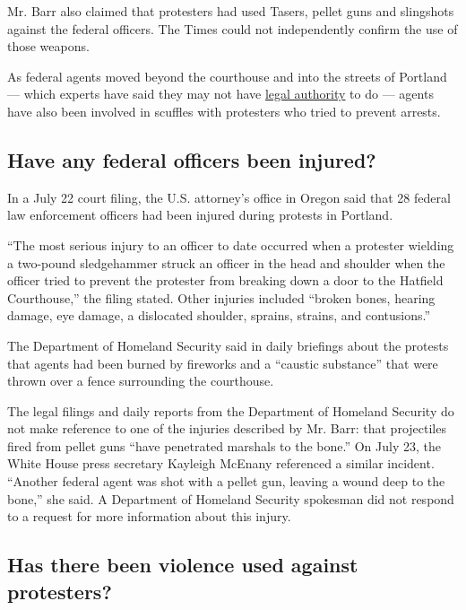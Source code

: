 Mr. Barr also claimed that protesters had used Tasers, pellet guns and
slingshots against the federal officers. The Times could not
independently confirm the use of those weapons.

As federal agents moved beyond the courthouse and into the streets of
Portland --- which experts have said they may not have
\href{https://www.nytimes3xbfgragh.onion/2020/07/25/us/portland-federal-legal-jurisdiction-courts.html}{legal
authority} to do --- agents have also been involved in scuffles with
protesters who tried to prevent arrests.

\hypertarget{have-any-federal-officers-been-injured}{%
\subsection{Have any federal officers been
injured?}\label{have-any-federal-officers-been-injured}}

In a July 22 court filing, the U.S. attorney's office in Oregon said
that 28 federal law enforcement officers had been injured during
protests in Portland.

``The most serious injury to an officer to date occurred when a
protester wielding a two-pound sledgehammer struck an officer in the
head and shoulder when the officer tried to prevent the protester from
breaking down a door to the Hatfield Courthouse,'' the filing stated.
Other injuries included ``broken bones, hearing damage, eye damage, a
dislocated shoulder, sprains, strains, and contusions.''

The Department of Homeland Security said in daily briefings about the
protests that agents had been burned by fireworks and a ``caustic
substance'' that were thrown over a fence surrounding the courthouse.

The legal filings and daily reports from the Department of Homeland
Security do not make reference to one of the injuries described by Mr.
Barr: that projectiles fired from pellet guns ``have penetrated marshals
to the bone.'' On July 23, the White House press secretary Kayleigh
McEnany referenced a similar incident. ``Another federal agent was shot
with a pellet gun, leaving a wound deep to the bone,'' she said. A
Department of Homeland Security spokesman did not respond to a request
for more information about this injury.

\hypertarget{has-there-been-violence-used-against-protesters}{%
\subsection{Has there been violence used against
protesters?}\label{has-there-been-violence-used-against-protesters}}

